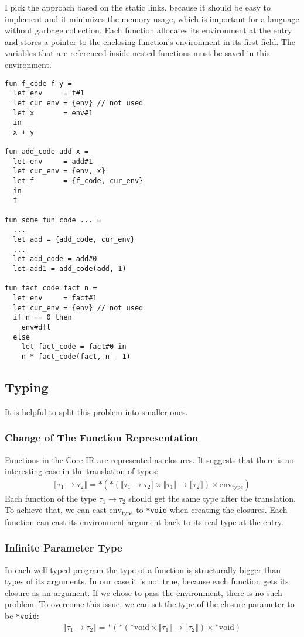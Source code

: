 \documentclass{article}
\newcommand\Denot[1]{\llbracket#1\rrbracket}
\newcommand*{\impl}{\mathbin{\to}}
\begin{document}
I pick the approach based on the static links, because it should be easy to implement and it minimizes the memory usage, which
is important for a language without garbage collection. Each function allocates its environment at the entry and stores
a pointer to the enclosing function's environment in its first field. The variables that are referenced inside nested functions
must be saved in this environment.

\begin{verbatim}
fun f_code f y = 
  let env     = f#1
  let cur_env = {env} // not used
  let x       = env#1
  in
  x + y

fun add_code add x = 
  let env     = add#1
  let cur_env = {env, x}
  let f       = {f_code, cur_env}
  in
  f

fun some_fun_code ... =
  ...
  let add = {add_code, cur_env}
  ...
  let add_code = add#0
  let add1 = add_code(add, 1)

fun fact_code fact n = 
  let env     = fact#1
  let cur_env = {env} // not used
  if n == 0 then
    env#dft
  else
    let fact_code = fact#0 in
    n * fact_code(fact, n - 1)
\end{verbatim}

\subsection{Typing}
It is helpful to split this problem into smaller ones.

\subsubsection{Change of The Function Representation}
Functions in the Core IR are represented as closures. It suggests that there is an interesting case in the translation of types:
\begin{align*}
    \Denot{\tau_1\impl\tau_2} = *(*(\Denot{\tau_1\impl\tau_2} \times \Denot{\tau_1} \impl \Denot{\tau_2}) \times \text{env}_\text{type})
\end{align*}
Each function of the type $\tau_1\impl\tau_2$ should get the same type after the translation.
To achieve that, we can cast $\text{env}_\text{type}$ to \texttt{*void} when creating the closures.
Each function can cast its environment argument back to its real type at the entry.

\subsubsection{Infinite Parameter Type}
In each well-typed program the type of a function is structurally bigger than types of its arguments.
In our case it is not true, because each function gets its closure as an argument.
If we chose to pass the environment, there is no such problem. 
To overcome this issue, we can set the type of the closure parameter to be \texttt{*void}:
\begin{align*}
    \Denot{\tau_1\impl\tau_2} = *(*(*\text{void} \times \Denot{\tau_1} \impl \Denot{\tau_2}) \times *\text{void})
\end{align*}
\end{document}
